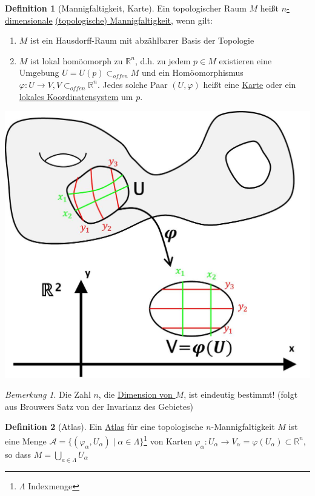 \documentclass[a4paper,11pt,notitlepage]{report}
\theoremstyle{remark}
\newtheorem{remark}{Bemerkung}[chapter]
\theoremstyle{definition}
\newtheorem{definition}{Definition}[chapter]
\newcommand{\R}{{\ensuremath{\mathbb{R}}}}
\begin{document}
\begin{definition}[Mannigfaltigkeit, Karte]
	Ein topologischer Raum $M$ heißt \underline{$n$-dimensionale} \underline{(topologische) Mannigfaltigkeit}, wenn gilt:
	\begin{enumerate}
		\item $M$ ist ein Hausdorff-Raum mit abzählbarer Basis der Topologie
		\item $M$ ist lokal homöomorph zu $\R^n$, d.h. zu jedem $p \in M$ existieren eine Umgebung $U=U(p) \subset_{offen} M$ und ein Homöomorphismus $\varphi \colon U \rightarrow V, V \subset_{offen} \R^n$.
			\newline
			Jedes solche Paar $(U,\varphi)$ heißt eine \underline{Karte} oder ein \underline{lokales Koordinatensystem} um $p$.
	\end{enumerate}
\end{definition}
\begin{center}
	\includegraphics[scale=0.4]{images/Karte.jpg} 
\end{center} 
 
\begin{remark}
	Die Zahl $n$, die \underline{Dimension von $M$}, ist eindeutig bestimmt!
	(folgt aus Brouwers Satz von der Invarianz des Gebietes) 
\end{remark}

\begin{definition}[Atlas]
	Ein \underline{Atlas} für eine topologische $n$-Mannigfaltigkeit $M$ ist eine Menge $\mathcal{A} = \{(\varphi_\alpha, U_\alpha) \mid \alpha \in \Lambda\}$\footnote{$\Lambda$ Indexmenge}
	von Karten $\varphi_\alpha \colon U_\alpha \rightarrow V_\alpha = \varphi(U_\alpha) \subset \R^n$, so dass $M = \bigcup\limits_{a \in \Lambda}{U_\alpha}$
\end{definition}
\end{document}
